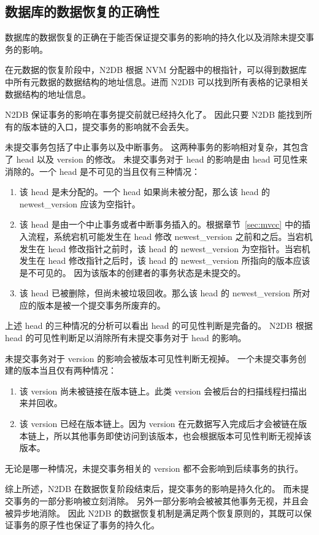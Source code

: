 \subsection{数据库的数据恢复的正确性}

数据库的数据恢复的正确在于能否保证提交事务的影响的持久化以及消除未提交事务的影响。

在元数据的恢复阶段中，N2DB 根据 NVM 分配器中的根指针，可以得到数据库中所有元数据的数据结构的地址信息。进而 N2DB 可以找到所有表格的记录相关数据结构的地址信息。

N2DB 保证事务的影响在事务提交前就已经持久化了。
因此只要 N2DB 能找到所有的版本链的入口，提交事务的影响就不会丢失。

未提交事务包括了中止事务以及中断事务。
这两种事务的影响相对复杂，其包含了 head 以及 version 的修改。
未提交事务对于 head 的影响是由 head 可见性来消除的。一个 head 是不可见的当且仅有三种情况：
\begin{enumerate}
    \item 该 head 是未分配的。一个 head 如果尚未被分配，那么该 head 的 newest\_version 应该为空指针。
    \item 该 head 是由一个中止事务或者中断事务插入的。根据章节~\ref{sec:mvcc} 中的插入流程，系统宕机可能发生在 head 修改 newest\_version 之前和之后。当宕机发生在 head 修改指针之前时，该 head 的 newest\_version 为空指针。当宕机发生在 head 修改指针之后时，该 head 的 newest\_version 所指向的版本应该是不可见的。
          因为该版本的创建者的事务状态是未提交的。
    \item 该 head 已被删除，但尚未被垃圾回收。那么该 head 的 newest\_version 所对应的版本是被一个提交事务所废弃的。
\end{enumerate}
上述 head 的三种情况的分析可以看出 head 的可见性判断是完备的。
N2DB 根据 head 的可见性判断足以消除所有未提交事务对于 head 的影响。

未提交事务对于 version 的影响会被版本可见性判断无视掉。
一个未提交事务创建的版本当且仅有两种情况：
\begin{enumerate}
    \item 该 version 尚未被链接在版本链上。此类 version 会被后台的扫描线程扫描出来并回收。
    \item 该 version 已经在版本链上。因为 version 在元数据写入完成后才会被链在版本链上，所以其他事务即使访问到该版本，也会根据版本可见性判断无视掉该版本。
\end{enumerate}
无论是哪一种情况，未提交事务相关的 version 都不会影响到后续事务的执行。

综上所述，N2DB 在数据恢复阶段结束后，提交事务的影响是持久化的。
而未提交事务的一部分影响被立刻消除。
另外一部分影响会被被其他事务无视，并且会被异步地消除。
因此 N2DB 的数据恢复机制是满足两个恢复原则的，其既可以保证事务的原子性也保证了事务的持久化。

